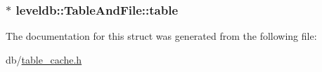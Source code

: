 \subsubsection[{table}]{$\ast$ leveldb\+::\+Table\+And\+File\+::table}\label{structleveldb_1_1_table_and_file_ab2df8b8a6c028cfcf36885fe76f48c99}


The documentation for this struct was generated from the following file\+:\begin{DoxyCompactItemize}
\item 
db/\hyperlink{table__cache_8h}{table\+\_\+cache.\+h}\end{DoxyCompactItemize}
